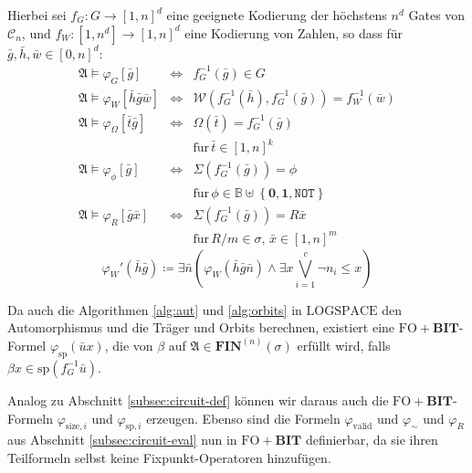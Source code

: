 Hierbei sei $f_{G}:G\rightarrow\left[1,n\right]^{d}$ eine geeignete
Kodierung der höchstens $n^{d}$ Gates von $\mathcal{C}_{n}$, und
$f_{W}:\left[1,n^{d}\right]\rightarrow\left[1,n\right]^{d}$ eine
Kodierung von Zahlen, so dass für $\bar{g},\bar{h},\bar{w}\in\left[0,n\right]^{d}$:
\begin{eqnarray*}
\mathfrak{A}\models\varphi_{G}\left[\bar{g}\right] & \Leftrightarrow & f_{G}^{-1}\left(\bar{g}\right)\in G\\
\mathfrak{A}\models\varphi_{W}\left[\bar{h}\bar{g}\bar{w}\right] & \Leftrightarrow & \mathcal{W}\left(f_{G}^{-1}\left(\bar{h}\right),f_{G}^{-1}\left(\bar{g}\right)\right)=f_{W}^{-1}\left(\bar{w}\right)\\
\mathfrak{A}\models\varphi_{\Omega}\left[\bar{t}\bar{g}\right] & \Leftrightarrow & \Omega\left(\bar{t}\right)=f_{G}^{-1}\left(\bar{g}\right)\\
 &  & \mathrm{f\ddot{u}r}\,\bar{t}\in\left[1,n\right]^{k}\\
\mathfrak{A}\models\varphi_{\phi}\left[\bar{g}\right] & \Leftrightarrow & \Sigma\left(f_{G}^{-1}\left(\bar{g}\right)\right)=\phi\\
 &  & \mathrm{f\ddot{u}r}\,\phi\in\mathbb{B}\uplus\left\{ \mathbf{0},\mathbf{1},\mathtt{NOT}\right\} \\
\mathfrak{A}\models\varphi_{R}\left[\bar{g}\bar{x}\right] & \Leftrightarrow & \Sigma\left(f_{G}^{-1}\left(\bar{g}\right)\right)=R\bar{x}\\
 &  & \mathrm{f\ddot{u}r}\,R/m\in\sigma,\,\bar{x}\in\left[1,n\right]^{m}
\end{eqnarray*}
\[
\varphi_{W}'\left(\bar{h}\bar{g}\right)\coloneqq\exists\bar{n}\left(\varphi_{W}\left(\bar{h}\bar{g}\bar{n}\right)\wedge\exists x\bigvee_{i=1}^{c}\neg n_{i}\leqslant x\right)
\]

Da auch die Algorithmen \ref{alg:aut} und \ref{alg:orbits} in $\mathrm{LOGSPACE}$
den Automorphismus und die Träger und Orbits berechnen, existiert
eine $\mathrm{FO}+\mathbf{BIT}$-Formel $\varphi_{\mathrm{sp}}\left(\bar{u}x\right)$,
die von $\beta$ auf $\mathfrak{A}\in\mathbf{FIN}^{\left(n\right)}\left(\sigma\right)$
erfüllt wird, falls $\beta x\in\mathrm{sp}\left(f_{G}^{-1}\bar{u}\right)$. 

Analog zu Abschnitt \ref{subsec:circuit-def} können wir daraus auch
die $\mathrm{FO}+\mathbf{BIT}$-Formeln $\varphi_{\mathrm{size},i}$
und $\varphi_{\mathrm{sp},i}$ erzeugen. Ebenso sind die Formeln $\varphi_{\mathrm{valid}}$
und $\varphi_{\sim}$ und $\varphi_{R}$ aus Abschnitt \ref{subsec:circuit-eval}
nun in $\mathrm{FO}+\mathbf{BIT}$ definierbar, da sie ihren Teilformeln
selbst keine Fixpunkt-Operatoren hinzufügen.

